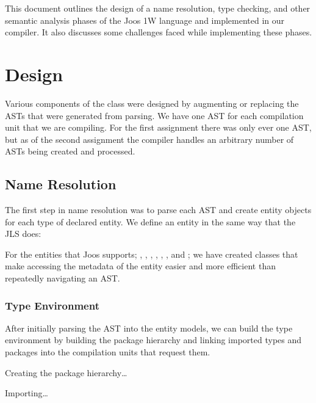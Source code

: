 \documentclass[pdftex,11pt,a4paper]{article}
\begin{document}

This document outlines the design of a name resolution, type checking,
and other semantic analysis phases of the Joos 1W language and
implemented in our compiler. It also discusses some challenges faced
while implementing these phases.


\section{Design}

Various components of the class were designed by augmenting or
replacing the ASTs that were generated from parsing. We have one AST
for each compilation unit that we are compiling. For the first
assignment there was only ever one AST, but as of the second
assignment the compiler handles an arbitrary number of ASTs being
created and processed.

\subsection{Name Resolution}

The first step in name resolution was to parse each AST and create
entity objects for each type of declared entity. We define an entity
in the same way that the JLS does:


For the entities that Joos supports; , ,
, , , , and
; we have created classes that make accessing the
metadata of the entity easier and more efficient than repeatedly
navigating an AST.


\subsubsection{Type Environment}

After initially parsing the AST into the entity models, we can build
the type environment by building the package hierarchy and linking
imported types and packages into the compilation units that request
them.

Creating the package hierarchy\ldots

Importing\ldots
\end{document}
